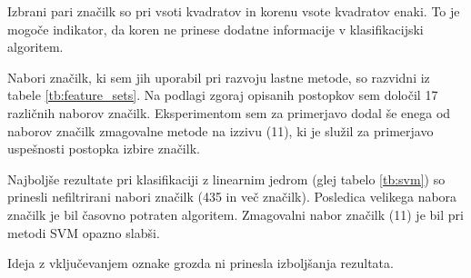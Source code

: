 \documentclass[11pt,a4paper,openany]{book}
\begin{document}
Izbrani pari značilk so pri vsoti kvadratov in korenu vsote kvadratov enaki. To je mogoče indikator, da koren ne prinese dodatne informacije v klasifikacijski algoritem.

Nabori značilk, ki sem jih uporabil pri razvoju lastne metode, so razvidni iz tabele \ref{tb:feature_sets}. Na podlagi zgoraj opisanih postopkov sem določil 17 različnih naborov značilk. Eksperimentom sem za primerjavo dodal še enega od naborov značilk zmagovalne metode na izzivu (11), ki je služil za primerjavo uspešnosti postopka izbire značilk.

Najboljše rezultate pri klasifikaciji z linearnim jedrom (glej tabelo \ref{tb:svm}) so prinesli nefiltrirani nabori značilk (435 in več značilk). Posledica velikega nabora značilk je bil časovno potraten algoritem. Zmagovalni nabor značilk (11) je bil pri metodi SVM opazno slabši. 

Ideja z vključevanjem oznake grozda ni prinesla izboljšanja rezultata. 
\end{document}
